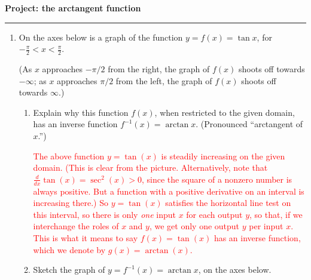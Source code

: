 \documentclass[letterpaper,10pt]{article}
\newcommand{\sol}[1]{\textcolor{red}{#1}}
\newcommand{\sol}[1]{\textcolor{white}{#1}}
\begin{document}
 
\centerline{\large {\bf Project: the  arctangent function }}
 
\hrule
\bigskip

\begin{enumerate}

\item On the axes below is a graph of the function $y=f(x)=\tan x$, for $-\frac{\pi}{2}< x< \frac{\pi}{2}$.

\begin{center}
\end{center}

(As $x$ approaches $-\pi/2$ from the right, the graph of $f(x)$ shoots off towards $-\infty$; as $x$ approaches $\pi/2$ from the left, the graph of $f(x)$ shoots off towards $\infty$.)
\begin{enumerate} 
\item Explain why this function $f(x)$, when restricted to the given domain, has an inverse function $f^{-1}(x)=\arctan x$.  (Pronounced ``arctangent of $x$.'')

\sol{The above function $y=\tan(x)$ is steadily increasing on the given domain.  (This is clear from the picture. Alternatively, note that $\frac{d}{dx}\tan(x)=\sec^2(x)>0$, since the square of a nonzero number is always positive.  But a function with a positive derivative on an interval is increasing there.)   So $y=\tan(x)$ satisfies the horizontal line test on this interval, so there is only {\it one}  input $x$ for each output  $y$,  so that, if we interchange the roles of $x$ and $y$, we get only one output $y$ per input  $x$.  This is what it means to say $f(x)=\tan(x)$ has an inverse function, which we denote by $g(x)=\arctan(x)$.}

\vfill

\item Sketch the graph of $y=f^{-1}(x)=\arctan x$, on the axes below.


\end{enumerate}
\end{enumerate}
\end{document}
